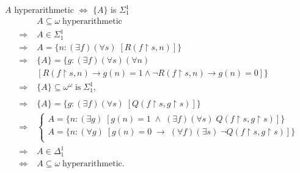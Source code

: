 \begin{frame}{$A$ hyperarithmetic $\Leftrightarrow$ $\{A\}$ is $\Sigma_1^1$}
  \begin{align*}
    \;&A\subseteq\omega\; \text{hyperarithmetic}\\
    \Rightarrow\; & A\in\Sigma_1^1\\
    \Rightarrow\; & A=\{n:(\exists f)(\forall s)\; [R(f\restriction s,n)]\}\\
    \Rightarrow\; & \{A\}= \{g:(\exists f)(\forall s)(\forall n)\\
    &[R(f\restriction s,n) \rightarrow g(n)=1 \wedge \neg R(f\restriction s,n)
      \rightarrow g(n)=0]\}\\
    \Rightarrow\; &\{A\}\subseteq\omega^\omega\; \text{is}\; \Sigma_1^1,\\
    &\\
    \Rightarrow\; & \{A\}= \{g:(\exists f)(\forall s)\; [Q(f\restriction
      s,g\restriction s)]\}\\
    \Rightarrow\; &
      \begin{cases}
        A=\{n:(\exists g)\; [g(n)=1\; \wedge\; (\exists f)(\forall s)\;
          Q(f\restriction s,g\restriction s)]\}\\
        A=\{n:(\forall g)\; [g(n)=0\; \rightarrow\; (\forall f)(\exists s)\;
          \neg Q(f\restriction s,g\restriction s)]\}\\
      \end{cases}\\
    \Rightarrow\; &A\in\Delta_1^1\\
    \Leftrightarrow\; &A\subseteq\omega\; \text{hyperarithmetic}.\\
  \end{align*}
\end{frame}

